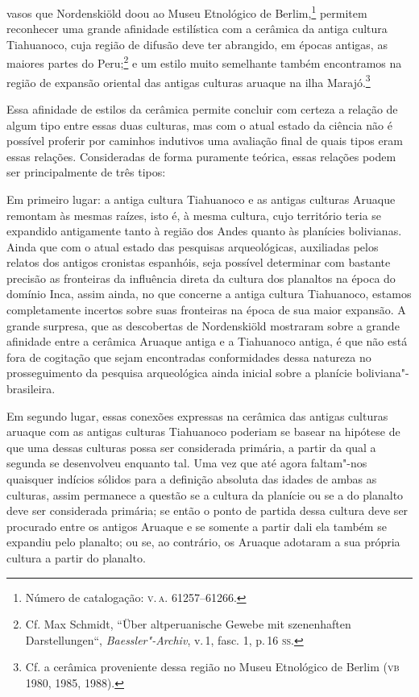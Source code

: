 vasos que Nordenskiöld doou ao Museu Etnológico de Berlim,\footnote{Número
  de catalogação: \textsc{v.\,a.} 61257--61266.} permitem reconhecer uma grande
afinidade estilística com a cerâmica da antiga cultura Tiahuanoco, cuja
região de difusão deve ter abrangido, em épocas antigas, as maiores
partes do Peru;\footnote{Cf. Max Schmidt, ``Über altperuanische Gewebe
  mit szenenhaften Darstellungen``, \textit{Baessler"-Archiv}, v.\,1, fasc.
  1, p.\,16 \textsc{ss}.} e um estilo muito semelhante também encontramos na
região de expansão oriental das antigas culturas aruaque na ilha
Marajó.\footnote{Cf. a cerâmica proveniente dessa região no Museu
  Etnológico de Berlim (\textsc{vb} 1980, 1985, 1988).}

Essa afinidade de estilos da cerâmica permite concluir com certeza a
relação de algum tipo entre essas duas culturas, mas com o atual estado
da ciência não é possível proferir por caminhos indutivos uma avaliação
final de quais tipos eram essas relações. Consideradas de forma
puramente teórica, essas relações podem ser principalmente de três
tipos:

Em primeiro lugar: a antiga cultura Tiahuanoco e as antigas culturas
Aruaque remontam às mesmas raízes, isto é, à mesma cultura, cujo
território teria se expandido antigamente tanto à região dos Andes
quanto às planícies bolivianas. Ainda que com o atual estado das
pesquisas arqueológicas, auxiliadas pelos relatos dos antigos cronistas
espanhóis, seja possível determinar com bastante precisão as fronteiras
da influência direta da cultura dos planaltos na época do domínio Inca,
assim ainda, no que concerne a antiga cultura Tiahuanoco, estamos
completamente incertos sobre suas fronteiras na época de sua maior
expansão. A grande surpresa, que as descobertas de Nordenskiöld
mostraram sobre a grande afinidade entre a cerâmica Aruaque antiga e a
Tiahuanoco antiga, é que não está fora de cogitação que sejam
encontradas conformidades dessa natureza no prosseguimento da pesquisa
arqueológica ainda inicial sobre a planície boliviana"-brasileira.

Em segundo lugar, essas conexões expressas na cerâmica das antigas
culturas aruaque com as antigas culturas Tiahuanoco poderiam se basear
na hipótese de que uma dessas culturas possa ser considerada primária,
a partir da qual a segunda se desenvolveu enquanto tal. Uma vez que até
agora faltam"-nos quaisquer indícios sólidos para a definição absoluta
das idades de ambas as culturas, assim permanece a questão se a cultura
da planície ou se a do planalto deve ser considerada primária; se então
o ponto de partida dessa cultura deve ser procurado entre os antigos
Aruaque e se somente a partir dali ela também se expandiu pelo planalto;
ou se, ao contrário, os Aruaque adotaram a sua própria cultura a partir
do planalto.

